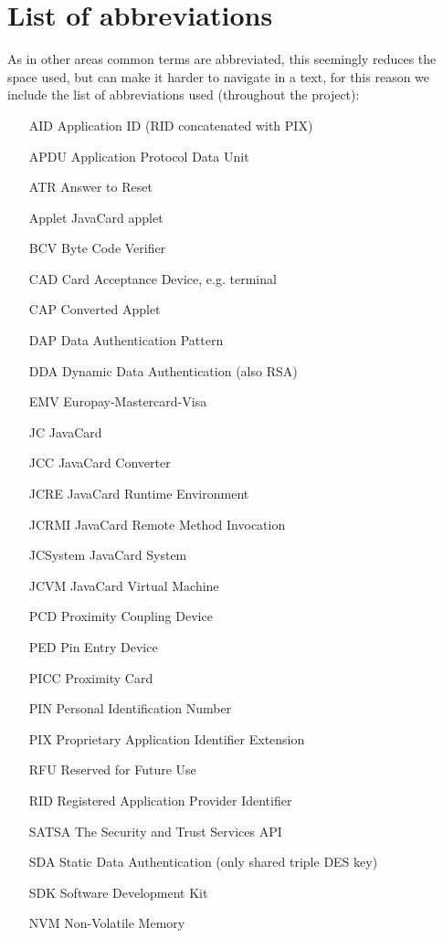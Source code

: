 \documentclass[a4paper]{scrartcl}
\subtitle{}
\begin{document}
\section*{List of abbreviations}
As in other areas common terms are abbreviated, this seemingly reduces the space used, but can make it harder to navigate in a text, for this reason we include the list of abbreviations used (throughout the project):
\begin{itemize}
    \item[AID] Application ID (RID concatenated with PIX)
    \item[APDU] Application Protocol Data Unit
    \item[ATR] Answer to Reset
    \item[Applet] JavaCard applet
    \item[BCV] Byte Code Verifier
    \item[CAD] Card Acceptance Device, e.g. terminal
    \item[CAP] Converted Applet
    \item[DAP] Data Authentication Pattern
    \item[DDA] Dynamic Data Authentication (also RSA)
    \item[EMV] Europay-Mastercard-Visa
    \item[JC] JavaCard
    \item[JCC] JavaCard Converter
    \item[JCRE] JavaCard Runtime Environment
    \item[JCRMI] JavaCard Remote Method Invocation
    \item[JCSystem] JavaCard System
    \item[JCVM] JavaCard Virtual Machine
    \item[PCD] Proximity Coupling Device
    \item[PED] Pin Entry Device
    \item[PICC] Proximity Card
    \item[PIN] Personal Identification Number
    \item[PIX] Proprietary Application Identifier Extension
    \item[RFU] Reserved for Future Use
    \item[RID] Registered Application Provider Identifier
    \item[SATSA] The Security and Trust Services API
    \item[SDA] Static Data Authentication (only shared triple DES key)
    \item[SDK] Software Development Kit
    \item[NVM] Non-Volatile Memory
\end{itemize}
\end{document}
